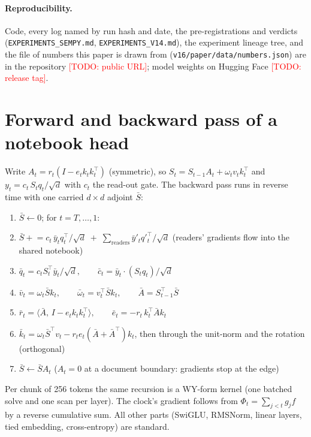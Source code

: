 \documentclass[11pt]{article}
\newcommand{\todo}[1]{\textcolor{red}{[TODO: #1]}}
\begin{document}
\paragraph{Reproducibility.} Code, every log named by run hash and date, the pre-registrations and verdicts (\texttt{EXPERIMENTS\_SEMPY.md}, \texttt{EXPERIMENTS\_V14.md}), the experiment lineage tree, and the file of numbers this paper is drawn from (\texttt{v16/paper/data/numbers.json}) are in the repository \todo{public URL}; model weights on Hugging Face \todo{release tag}.




\appendix
\section{Forward and backward pass of a notebook head}
\label{app:bwd}
Write $A_t = r_t(I - e_t k_t k_t^\top)$ (symmetric), so $S_t = S_{t-1}A_t + \omega_t v_t k_t^\top$ and $y_t = c_t\, S_t q_t/\sqrt d$ with $c_t$ the read-out gate. The backward pass runs in reverse time with one carried $d\times d$ adjoint $\bar S$:
\begin{enumerate}[leftmargin=1.6em,itemsep=1pt]
\item $\bar S \gets 0$; for $t = T,\dots,1$:
\item $\bar S \mathrel{+}= c_t\,\bar y_t q_t^\top/\sqrt d \;+\; \sum_{\text{readers}} \bar y'_t q'^\top_t/\sqrt d$ \hfill (readers' gradients flow into the shared notebook)
\item $\bar q_t = c_t S_t^\top \bar y_t/\sqrt d,\qquad \bar c_t = \bar y_t\cdot(S_t q_t)/\sqrt d$
\item $\bar v_t = \omega_t \bar S k_t,\qquad \bar\omega_t = v_t^\top \bar S k_t,\qquad \bar A = S_{t-1}^\top \bar S$
\item $\bar r_t = \langle \bar A,\, I - e_t k_t k_t^\top\rangle,\qquad \bar e_t = -r_t\, k_t^\top \bar A k_t$
\item $\bar k_t = \omega_t \bar S^\top v_t - r_t e_t(\bar A + \bar A^\top)k_t$, then through the unit-norm and the rotation (orthogonal)
\item $\bar S \gets \bar S A_t$ \hfill ($A_t = 0$ at a document boundary: gradients stop at the edge)
\end{enumerate}
Per chunk of 256 tokens the same recursion is a WY-form kernel (one batched solve and one scan per layer).
The clock's gradient follows from $\Phi_t = \sum_{j<t} g_j f$ by a reverse cumulative sum. All other parts (SwiGLU, RMSNorm, linear layers, tied embedding, cross-entropy) are standard.
\end{document}
